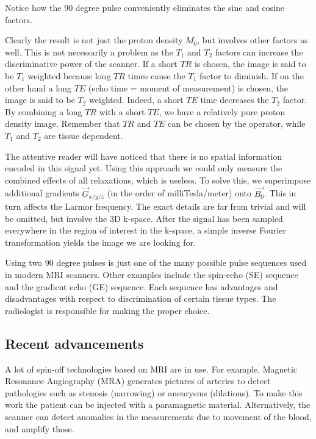 Notice how the 90 degree pulse conveniently eliminates the sine and cosine
factors.

Clearly the result is not just the proton density $M_0$, but involves other
factors as well. This is not necessarily a problem as the $T_1$ and $T_2$
factors can increase the discriminative power of the scanner. If a short $TR$ is
chosen, the image is said to be $T_1$ weighted because long $TR$ times cause the
$T_1$ factor to diminish. If on the other hand a long $TE$ (echo time = moment
of measurement) is chosen, the image is said to be $T_2$ weighted. Indeed, a
short $TE$ time decreases the $T_2$ factor. By combining a long $TR$ with a
short $TE$, we have a relatively pure proton density image. Remember that $TR$
and $TE$ can be chosen by the operator, while $T_1$ and $T_2$ are tissue
dependent.

The attentive reader will have noticed that there is no spatial information
encoded in this signal yet. Using this approach we could only measure the
combined effects of all relaxations, which is useless. To solve this, we
superimpose additional gradients $\vec{G}_{x/y/z}$ (in the order of
milliTesla/meter) onto $\vec{B_0}$. This in turn affects the Larmor frequency.
The exact details are far from trivial and will be omitted, but involve the
3D k-space. After the signal has been sampled everywhere in the region of
interest in the k-space, a simple inverse Fourier transformation yields the
image we are looking for.

Using two 90 degree pulses is just one of the many possible pulse sequences used
in modern MRI scanners. Other examples include the spin-echo (SE) sequence and
the gradient echo (GE) sequence. Each sequence has advantages and disadvantages
with respect to discrimination of certain tissue types. The radiologist is
responsible for making the proper choice.


\subsection{Recent advancements}
A lot of spin-off technologies based on MRI are in use. For example, Magnetic
Resonance Angiography (MRA) generates pictures of arteries to detect pathologies
such as stenosis (narrowing) or aneurysms (dilations). To make this work the
patient can be injected with a paramagnetic material. Alternatively, the scanner
can detect anomalies in the measurements due to movement of the blood, and
amplify those.

